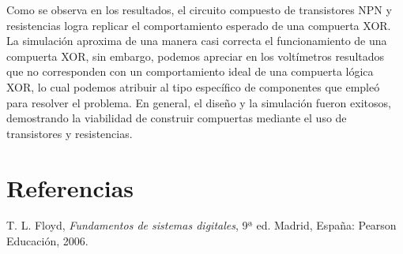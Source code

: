 \documentclass{article}
\begin{document}
Como se observa en los resultados, el circuito compuesto de transistores NPN y resistencias logra replicar el comportamiento esperado de una compuerta XOR. La simulación aproxima de una manera casi correcta el funcionamiento de una compuerta XOR, sin embargo, podemos apreciar en los voltímetros resultados que no corresponden con un comportamiento ideal de una compuerta lógica XOR, lo cual podemos atribuir al tipo específico de componentes que empleó para resolver el problema. En general, el diseño y la simulación fueron exitosos, demostrando la viabilidad de construir compuertas mediante el uso de transistores y resistencias.

\section{Referencias}
\label{sec:referencias}
\begin{thebibliography}{99}
 T. L. Floyd, \textit{Fundamentos de sistemas digitales}, 9ª ed. Madrid, España: Pearson Educación, 2006.
\end{thebibliography}
\end{document}
